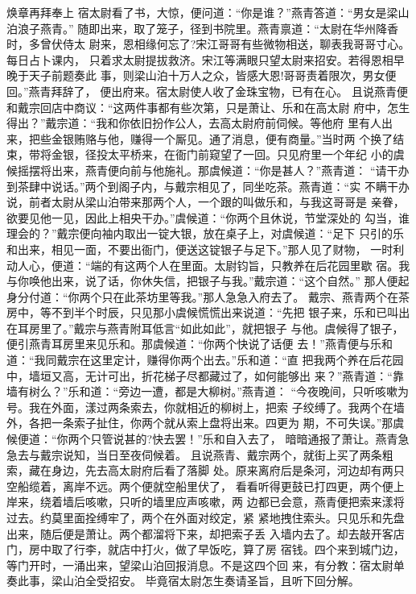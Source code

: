 焕章再拜奉上
宿太尉看了书，大惊，便问道：“你是谁？”燕青答道：“男女是梁山泊浪子燕青。”
随即出来，取了笼子，径到书院里。燕青禀道：“太尉在华州降香时，多曾伏侍太
尉来，恩相缘何忘了?宋江哥哥有些微物相送，聊表我哥哥寸心。每日占卜课内，
只着求太尉提拔救济。宋江等满眼只望太尉来招安。若得恩相早晚于天子前题奏此
事，则梁山泊十万人之众，皆感大恩!哥哥责着限次，男女便回。”燕青拜辞了，
便出府来。宿太尉使人收了金珠宝物，已有在心。
且说燕青便和戴宗回店中商议：“这两件事都有些次第，只是萧让、乐和在高太尉
府中，怎生得出？”戴宗道：“我和你依旧扮作公人，去高太尉府前伺候。等他府
里有人出来，把些金银贿赂与他，赚得一个厮见。通了消息，便有商量。”当时两
个换了结束，带将金银，径投太平桥来，在衙门前窥望了一回。只见府里一个年纪
小的虞候摇摆将出来，燕青便向前与他施礼。那虞候道：“你是甚人？”燕青道：
“请干办到茶肆中说话。”两个到阁子内，与戴宗相见了，同坐吃茶。燕青道：“实
不瞒干办说，前者太尉从梁山泊带来那两个人，一个跟的叫做乐和，与我这哥哥是
亲眷，欲要见他一见，因此上相央干办。”虞候道：“你两个且休说，节堂深处的
勾当，谁理会的？”戴宗便向袖内取出一锭大银，放在桌子上，对虞候道：“足下
只引的乐和出来，相见一面，不要出衙门，便送这锭银子与足下。”那人见了财物，
一时利动人心，便道：“端的有这两个人在里面。太尉钧旨，只教养在后花园里歇
宿。我与你唤他出来，说了话，你休失信，把银子与我。”戴宗道：“这个自然。”
那人便起身分付道：“你两个只在此茶坊里等我。”那人急急入府去了。
戴宗、燕青两个在茶房中，等不到半个时辰，只见那小虞候慌慌出来说道：“先把
银子来，乐和已叫出在耳房里了。”戴宗与燕青附耳低言“如此如此”，就把银子
与他。虞候得了银子，便引燕青耳房里来见乐和。那虞候道：“你两个快说了话便
去！”燕青便与乐和道：“我同戴宗在这里定计，赚得你两个出去。”乐和道：“直
把我两个养在后花园中，墙垣又高，无计可出，折花梯子尽都藏过了，如何能够出
来？”燕青道：“靠墙有树么？”乐和道：“旁边一遭，都是大柳树。”燕青道：
“今夜晚间，只听咳嗽为号。我在外面，漾过两条索去，你就相近的柳树上，把索
子绞缚了。我两个在墙外，各把一条索子扯住，你两个就从索上盘将出来。四更为
期，不可失误。”那虞候便道：“你两个只管说甚的?快去罢！”乐和自入去了，
暗暗通报了萧让。燕青急急去与戴宗说知，当日至夜伺候着。
且说燕青、戴宗两个，就街上买了两条粗索，藏在身边，先去高太尉府后看了落脚
处。原来离府后是条河，河边却有两只空船缆着，离岸不远。两个便就空船里伏了，
看看听得更鼓已打四更，两个便上岸来，绕着墙后咳嗽，只听的墙里应声咳嗽，两
边都已会意，燕青便把索来漾将过去。约莫里面拴缚牢了，两个在外面对绞定，紧
紧地拽住索头。只见乐和先盘出来，随后便是萧让。两个都溜将下来，却把索子丢
入墙内去了。却去敲开客店门，房中取了行李，就店中打火，做了早饭吃，算了房
宿钱。四个来到城门边，等门开时，一涌出来，望梁山泊回报消息。不是这四个回
来，有分教：宿太尉单奏此事，梁山泊全受招安。
毕竟宿太尉怎生奏请圣旨，且听下回分解。